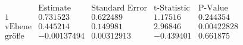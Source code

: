 \[\begin{array}{l|llll}
 \text{} & \text{Estimate} & \text{Standard Error} & \text{t-Statistic} & \text{P-Value} \\
\hline
 1 & 0.731523 & 0.622489 & 1.17516 & 0.244354 \\
 \text{vEbene} & 0.445214 & 0.149981 & 2.96846 & 0.00422828 \\
 \text{gr{\" o}{\ss}e} & -0.00137494 & 0.00312913 & -0.439401 & 0.661875 \\
\end{array}\]

